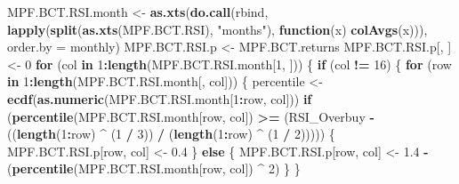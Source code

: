 \documentclass[
]{article}
\newenvironment{Shaded}{\begin{snugshade}}{\end{snugshade}}
\newcommand{\ControlFlowTok}[1]{\textcolor[rgb]{0.13,0.29,0.53}{\textbf{#1}}}
\newcommand{\DataTypeTok}[1]{\textcolor[rgb]{0.13,0.29,0.53}{#1}}
\newcommand{\DecValTok}[1]{\textcolor[rgb]{0.00,0.00,0.81}{#1}}
\newcommand{\FloatTok}[1]{\textcolor[rgb]{0.00,0.00,0.81}{#1}}
\newcommand{\KeywordTok}[1]{\textcolor[rgb]{0.13,0.29,0.53}{\textbf{#1}}}
\newcommand{\NormalTok}[1]{#1}
\newcommand{\OperatorTok}[1]{\textcolor[rgb]{0.81,0.36,0.00}{\textbf{#1}}}
\newcommand{\StringTok}[1]{\textcolor[rgb]{0.31,0.60,0.02}{#1}}
\begin{document}
\begin{Shaded}
\begin{Highlighting}[]
\NormalTok{MPF.BCT.RSI.month <-}
\StringTok{  }\KeywordTok{as.xts}\NormalTok{(}\KeywordTok{do.call}\NormalTok{(rbind, }\KeywordTok{lapply}\NormalTok{(}\KeywordTok{split}\NormalTok{(}\KeywordTok{as.xts}\NormalTok{(MPF.BCT.RSI), }\StringTok{"months"}\NormalTok{), }\ControlFlowTok{function}\NormalTok{(x)}
    \KeywordTok{colAvgs}\NormalTok{(x))), }\DataTypeTok{order.by =}\NormalTok{ monthly)}
\NormalTok{MPF.BCT.RSI.p <-}\StringTok{ }\NormalTok{MPF.BCT.returns}
\NormalTok{MPF.BCT.RSI.p[, ] <-}\StringTok{ }\DecValTok{0}
\ControlFlowTok{for}\NormalTok{ (col }\ControlFlowTok{in} \DecValTok{1}\OperatorTok{:}\KeywordTok{length}\NormalTok{(MPF.BCT.RSI.month[}\DecValTok{1}\NormalTok{, ])) \{}
  \ControlFlowTok{if}\NormalTok{ (col }\OperatorTok{!=}\StringTok{ }\DecValTok{16}\NormalTok{) \{}
    \ControlFlowTok{for}\NormalTok{ (row }\ControlFlowTok{in} \DecValTok{1}\OperatorTok{:}\KeywordTok{length}\NormalTok{(MPF.BCT.RSI.month[, col])) \{}
\NormalTok{      percentile <-}\StringTok{ }\KeywordTok{ecdf}\NormalTok{(}\KeywordTok{as.numeric}\NormalTok{(MPF.BCT.RSI.month[}\DecValTok{1}\OperatorTok{:}\NormalTok{row, col]))}
      \ControlFlowTok{if}\NormalTok{ (}\KeywordTok{percentile}\NormalTok{(MPF.BCT.RSI.month[row, col]) }\OperatorTok{>=}\StringTok{ }\NormalTok{(RSI_Overbuy }\OperatorTok{-}\StringTok{ }\NormalTok{((}\KeywordTok{length}\NormalTok{(}\DecValTok{1}\OperatorTok{:}\NormalTok{row) }\OperatorTok{^}
\StringTok{                                                                      }\NormalTok{(}\DecValTok{1} \OperatorTok{/}\StringTok{ }\DecValTok{3}\NormalTok{)) }\OperatorTok{/}\StringTok{ }\NormalTok{(}\KeywordTok{length}\NormalTok{(}\DecValTok{1}\OperatorTok{:}\NormalTok{row) }\OperatorTok{^}\StringTok{ }\NormalTok{(}\DecValTok{1} \OperatorTok{/}\StringTok{ }\DecValTok{2}\NormalTok{))))) \{}
\NormalTok{        MPF.BCT.RSI.p[row, col] <-}\StringTok{ }\FloatTok{0.4}
\NormalTok{      \} }\ControlFlowTok{else}\NormalTok{ \{}
\NormalTok{        MPF.BCT.RSI.p[row, col] <-}
\StringTok{          }\FloatTok{1.4} \OperatorTok{-}\StringTok{ }\NormalTok{(}\KeywordTok{percentile}\NormalTok{(MPF.BCT.RSI.month[row, col]) }\OperatorTok{^}\StringTok{ }\DecValTok{2}\NormalTok{)}
\NormalTok{      \}}
\NormalTok{    \}}
    

\end{Highlighting}
\end{Shaded}
\end{document}
